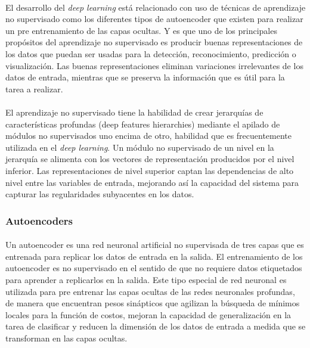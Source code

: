 \documentclass[12pt]{article}%
\begin{document}
\paragraph{}
El desarrollo del \textit{deep learning} está relacionado con uso de técnicas de aprendizaje no supervisado como los diferentes tipos de autoencoder que existen para realizar un pre entrenamiento de las capas ocultas. Y es que uno de los principales propósitos del aprendizaje no supervisado es producir buenas representaciones de los datos \cite{ranzato} que puedan ser usadas para la detección, reconocimiento, predicción o visualización. Las buenas representaciones eliminan variaciones irrelevantes de los datos de entrada, mientras que se preserva la información que es útil para la tarea a realizar.

\paragraph{}
El aprendizaje no supervisado tiene la habilidad de crear jerarquías de características profundas (deep features hierarchies) mediante el apilado de módulos no supervisados uno encima de otro, habilidad que es frecuentemente utilizada en el \textit{deep learning}. Un módulo no supervisado de un nivel en la jerarquía se alimenta con los vectores de representación producidos por el nivel inferior. Las representaciones de nivel superior captan las dependencias de alto nivel entre las variables de entrada, mejorando así la capacidad del sistema para capturar las regularidades subyacentes en los datos.

\subsubsection{Autoencoders}
\paragraph{}
Un autoencoder es una red neuronal artificial no supervisada de tres capas que es entrenada para replicar los datos de entrada en la salida. El entrenamiento de los autoencoder es no supervisado en el sentido de que no requiere datos etiquetados para aprender a replicarlos en la salida. Este tipo especial de red neuronal es utilizada para pre entrenar las capas ocultas de las redes neuronales profundas, de manera que encuentran pesos sinápticos que agilizan la búsqueda de mínimos locales para la función de costos, mejoran la capacidad de generalización en la tarea de clasificar y reducen la dimensión de los datos de entrada a medida que se transforman en las capas ocultas.
\end{document}
